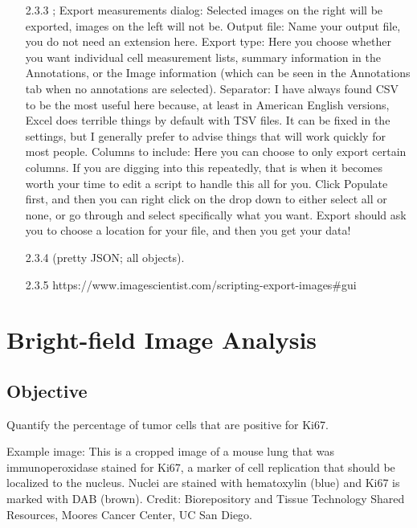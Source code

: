 \documentclass[a4paper,12pt]{article}
\begin{document}
\begin{enumerate}
    \item[2.3.3] \soln {} \solnend; Export measurements dialog: Selected images on the right will be exported, images on the left will not be. Output file: Name your output file, you do not need an extension here. Export type: Here you choose whether you want individual cell measurement lists, summary information in the Annotations, or the Image information (which can be seen in the Annotations tab when no annotations are selected). Separator: I have always found CSV to be the most useful here because, at least in American English versions, Excel does terrible things by default with TSV files. It can be fixed in the settings, but I generally prefer to advise things that will work quickly for most people. Columns to include: Here you can choose to only export certain columns. If you are digging into this repeatedly, that is when it becomes worth your time to edit a script to handle this all for you. Click Populate first, and then you can right click on the drop down to either select all or none, or go through and select specifically what you want. Export should ask you to choose a location for your file, and then you get your data!
    \item[2.3.4] \soln {} \solnend (pretty JSON; all objects).
    \item[2.3.5]
   https://www.imagescientist.com/scripting-export-images#gui
\end{enumerate}

\section{Bright-field Image Analysis}
\subsection{Objective}
Quantify the percentage of tumor cells that are positive for Ki67. 

\noindent Example image: This is a cropped image of a mouse lung that was immunoperoxidase stained for Ki67, a marker of cell replication that should be localized to the nucleus. Nuclei are stained with hematoxylin (blue) and Ki67 is marked with DAB (brown). Credit: Biorepository and Tissue Technology Shared Resources, Moores Cancer Center, UC San Diego.
\end{document}
